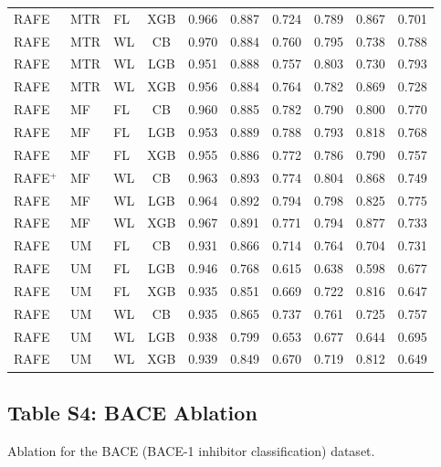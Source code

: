 \documentclass[9pt,a4paper]{article}
\begin{document}
\begin{scriptsize}
\begin{longtable}{lllcrrrrrr}
RAFE & MTR & FL & XGB & 0.966 & 0.887 & 0.724 & 0.789 & 0.867 & 0.701 \\
RAFE & MTR & WL & CB  & 0.970 & 0.884 & 0.760 & 0.795 & 0.738 & 0.788 \\
RAFE & MTR & WL & LGB & 0.951 & 0.888 & 0.757 & 0.803 & 0.730 & 0.793 \\
RAFE & MTR & WL & XGB & 0.956 & 0.884 & 0.764 & 0.782 & 0.869 & 0.728 \\
RAFE & MF  & FL & CB  & 0.960 & 0.885 & 0.782 & 0.790 & 0.800 & 0.770 \\
RAFE & MF  & FL & LGB & 0.953 & 0.889 & 0.788 & 0.793 & 0.818 & 0.768 \\
RAFE & MF  & FL & XGB & 0.955 & 0.886 & 0.772 & 0.786 & 0.790 & 0.757 \\
RAFE$^+$ & MF & WL & CB  & 0.963 & 0.893 & 0.774 & 0.804 & 0.868 & 0.749 \\
RAFE & MF  & WL & LGB & 0.964 & 0.892 & 0.794 & 0.798 & 0.825 & 0.775 \\
RAFE & MF  & WL & XGB & 0.967 & 0.891 & 0.771 & 0.794 & 0.877 & 0.733 \\
RAFE & UM  & FL & CB  & 0.931 & 0.866 & 0.714 & 0.764 & 0.704 & 0.731 \\
RAFE & UM  & FL & LGB & 0.946 & 0.768 & 0.615 & 0.638 & 0.598 & 0.677 \\
RAFE & UM  & FL & XGB & 0.935 & 0.851 & 0.669 & 0.722 & 0.816 & 0.647 \\
RAFE & UM  & WL & CB  & 0.935 & 0.865 & 0.737 & 0.761 & 0.725 & 0.757 \\
RAFE & UM  & WL & LGB & 0.938 & 0.799 & 0.653 & 0.677 & 0.644 & 0.695 \\
RAFE & UM  & WL & XGB & 0.939 & 0.849 & 0.670 & 0.719 & 0.812 & 0.649 \\
\end{longtable}
\end{scriptsize}

\newpage

\subsection*{Table S4: BACE Ablation}
Ablation for the BACE (BACE-1 inhibitor classification) dataset.
\end{document}
